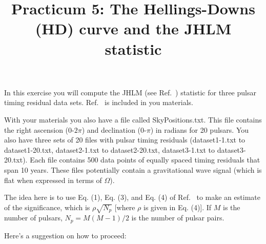\documentclass[prd,floatfix,preprintnumbers,amsmath,amssymb,nofootinbib,superscriptaddress]{revtex4}
\begin{document}
\title{Practicum 5: The Hellings-Downs (HD) curve and the JHLM statistic }

\maketitle

In this exercise you will compute the JHLM (see Ref.~\cite{Jenet}) statistic for 
three pulsar timing residual data sets. Ref.~\cite{Jenet} is included in you materials.

With your materials you also have a file called SkyPositions.txt.  This file contains the right 
ascension ($0$-$2\pi$) and declination ($0$-$\pi$) in radians for 20 pulsars. 
You also have three sets of 20 files
with pulsar timing residuals (dataset1-1.txt to dataset1-20.txt, dataset2-1.txt to 
dataset2-20.txt, dataset3-1.txt to dataset3-20.txt). Each file contains 500 data points 
of equally spaced timing residuals that span 10 years. These files potentially contain
a gravitational wave signal (which is flat when expressed in terms of $\Omega$).

The idea here is to use Eq. (1), Eq. (3), and Eq. (4) of Ref.~\cite{Jenet} to make an 
estimate of the significance, which is $\rho \sqrt{N_p}$ [where $\rho$ is 
given in Eq. (4)]. If $M$ is the number of pulsars, $N_p=M(M-1)/2$ is the number of pulsar pairs. 

\vspace{0.3in}
Here's a suggestion on how to proceed:
\end{document}

